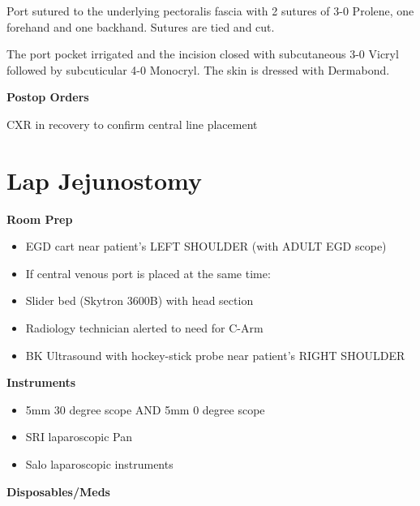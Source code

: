 \documentclass[
]{book}
\providecommand{\tightlist}{%
  \setlength{\itemsep}{0pt}\setlength{\parskip}{0pt}}
\begin{document}
Port sutured to the underlying pectoralis fascia with 2 sutures of 3-0 Prolene, one forehand and one backhand. Sutures are tied and cut.

The port pocket irrigated and the incision closed with subcutaneous 3-0 Vicryl followed by subcuticular 4-0 Monocryl. The skin is dressed with Dermabond.

\textbf{Postop Orders}

CXR in recovery to confirm central line placement

\hypertarget{lap-jejunostomy}{%
\chapter{Lap Jejunostomy}\label{lap-jejunostomy}}

\textbf{Room Prep}

\begin{itemize}
\tightlist
\item
  EGD cart near patient's LEFT SHOULDER (with ADULT EGD scope)
\item
  If central venous port is placed at the same time:
\item
  Slider bed (Skytron 3600B) with head section
\item
  Radiology technician alerted to need for C-Arm
\item
  BK Ultrasound with hockey-stick probe near patient's RIGHT SHOULDER
\end{itemize}

\textbf{Instruments}

\begin{itemize}
\tightlist
\item
  5mm 30 degree scope AND 5mm 0 degree scope
\item
  SRI laparoscopic Pan
\item
  Salo laparoscopic instruments
\end{itemize}

\textbf{Disposables/Meds}
\end{document}
